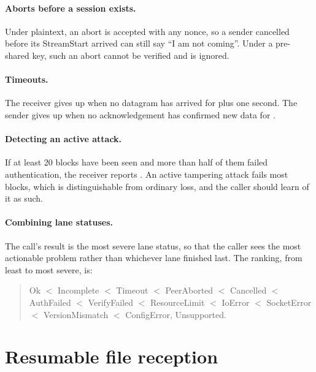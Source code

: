 \paragraph{Aborts before a session exists.} Under plaintext, an abort is accepted with any nonce, so a sender
cancelled before its StreamStart arrived can still say ``I am not coming''. Under a pre-shared key, such an abort
cannot be verified and is ignored.

\paragraph{Timeouts.} The receiver gives up when no datagram has arrived for  plus one second.
The sender gives up when no acknowledgement has confirmed new data for .

\paragraph{Detecting an active attack.} If at least 20 blocks have been seen and more than half of them failed
authentication, the receiver reports . An active tampering attack fails most blocks, which is
distinguishable from ordinary loss, and the caller should learn of it as such.

\paragraph{Combining lane statuses.} The call's result is the most severe lane status, so that the caller sees
the most actionable problem rather than whichever lane finished last. The ranking, from least to most severe,
is:
\begin{quote}\small
Ok $<$ Incomplete $<$ Timeout $<$ PeerAborted $<$ Cancelled $<$ AuthFailed $<$ VerifyFailed $<$ ResourceLimit
$<$ IoError $<$ SocketError $<$ VersionMismatch $<$ ConfigError, Unsupported.
\end{quote}

\section{Resumable file reception}\label{sec:resume}

